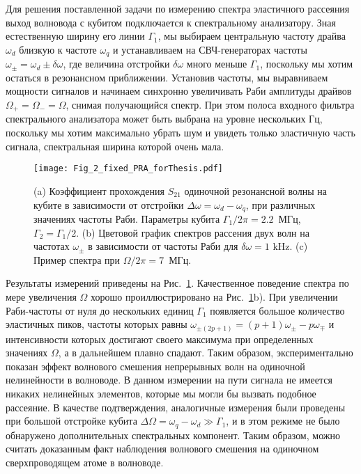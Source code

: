Для решения поставленной задачи по измерению спектра эластичного рассеяния выход волновода с кубитом подключается к спектральному анализатору.  Зная естественную ширину его линии $\Gamma_1$, мы выбираем центральную частоту драйва $\omega_d$ близкую к частоте $\omega_q$ и устанавливаем на СВЧ-генераторах частоты $\omega_\pm = \omega_d \pm \delta\omega$, где величина отстройки $\delta\omega$ много меньше $\Gamma_1$, поскольку мы хотим остаться в резонансном приближении. Установив частоты, мы выравниваем мощности сигналов и начинаем синхронно увеличивать Раби амплитуды драйвов $\Omega_+ = \Omega_- = \Omega$, снимая получающийся спектр. При этом полоса входного фильтра спектрального анализатора может быть выбрана на уровне нескольких Гц, поскольку мы хотим максимально убрать шум и увидеть только эластичную часть сигнала, спектральная ширина которой очень мала.
\begin{figure}[thb]
	\centering
	\texttt{[image: Fig\_2\_fixed\_PRA\_forThesis.pdf]}
	\caption[Волновое смешение: появление дополнительных компонент эластично рассеянного сигнала]{(a) Коэффициент прохождения $S_{21}$ одиночной резонансной волны на кубите в зависимости от отстройки $\Delta\omega = \omega_d-\omega_q$, при различных значениях частоты Раби. Параметры кубита $\Gamma_1/2\pi = 2.2$~МГц, $\Gamma_2 = \Gamma_1/2$. (b) Цветовой график спектров рассения двух волн на частотах $\omega_{\pm}$ в зависимости от частоты Раби для $\delta\omega = 1$ kHz. (c) Пример спектра при $\Omega/2\pi=7$~МГц. }
	\label{fig: CWM}
\end{figure}
Результаты измерений приведены на Рис.~\ref{fig: CWM}. Качественное поведение спектра по мере увеличения $\Omega$ хорошо проиллюстрировано на Рис.~\ref{fig: CWM}b). При увеличении Раби-частоты от нуля до нескольких единиц $\Gamma_1$ появляется большое количество эластичных пиков, частоты которых равны $\omega_{\pm(2p+1)} = (p+1)\omega_\pm-p\omega_\mp$ и интенсивности которых достигают своего максимума при определенных значениях $\Omega$, а в дальнейшем плавно спадают. Таким образом, экспериментально показан эффект волнового смешения непрерывных волн на одиночной нелинейности в волноводе. В данном измерении на пути сигнала не имеется никаких нелинейных элементов, которые мы могли бы вызвать подобное рассеяние. В качестве подтверждения, аналогичные измерения были проведены при большой отстройке кубита $\Delta\Omega = \omega_q - \omega_d \gg \Gamma_1 $, и в этом режиме не было обнаружено дополнительных спектральных компонент. Таким образом, можно считать доказанным факт наблюдения волнового смешения на одиночном сверхпроводящем атоме в волноводе.  

